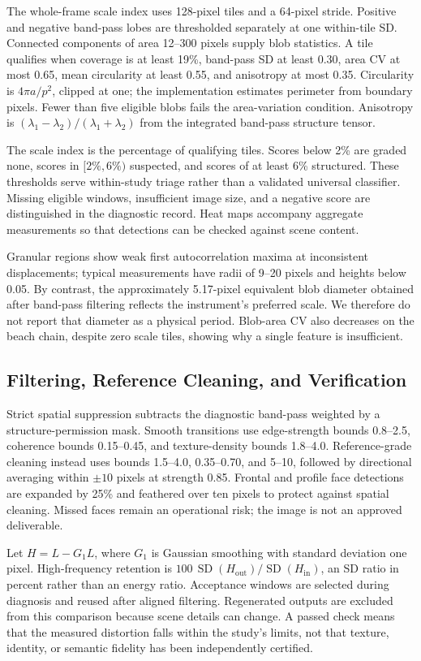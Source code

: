 \documentclass[sigplan,10pt,nonacm]{acmart}
\newcommand{\sd}{\operatorname{SD}}
\begin{document}
The whole-frame scale index uses 128-pixel tiles and a 64-pixel stride. Positive and negative band-pass lobes are thresholded separately at one within-tile SD. Connected components of area 12--300 pixels supply blob statistics. A tile qualifies when coverage is at least 19\%, band-pass SD at least 0.30, area CV at most 0.65, mean circularity at least 0.55, and anisotropy at most 0.35. Circularity is $4\pi a/p^2$, clipped at one; the implementation estimates perimeter from boundary pixels. Fewer than five eligible blobs fails the area-variation condition. Anisotropy is $(\lambda_1-\lambda_2)/(\lambda_1+\lambda_2)$ from the integrated band-pass structure tensor.

The scale index is the percentage of qualifying tiles. Scores below 2\% are graded none, scores in $[2\%,6\%)$ suspected, and scores of at least 6\% structured. These thresholds serve within-study triage rather than a validated universal classifier. Missing eligible windows, insufficient image size, and a negative score are distinguished in the diagnostic record. Heat maps accompany aggregate measurements so that detections can be checked against scene content.

Granular regions show weak first autocorrelation maxima at inconsistent displacements; typical measurements have radii of 9--20 pixels and heights below 0.05. By contrast, the approximately 5.17-pixel equivalent blob diameter obtained after band-pass filtering reflects the instrument's preferred scale. We therefore do not report that diameter as a physical period. Blob-area CV also decreases on the beach chain, despite zero scale tiles, showing why a single feature is insufficient.

\subsection{Filtering, Reference Cleaning, and Verification}
Strict spatial suppression subtracts the diagnostic band-pass weighted by a structure-permission mask. Smooth transitions use edge-strength bounds 0.8--2.5, coherence bounds 0.15--0.45, and texture-density bounds 1.8--4.0. Reference-grade cleaning instead uses bounds 1.5--4.0, 0.35--0.70, and 5--10, followed by directional averaging within $\pm10$ pixels at strength 0.85. Frontal and profile face detections are expanded by 25\% and feathered over ten pixels to protect against spatial cleaning. Missed faces remain an operational risk; the image is not an approved deliverable.

Let $H=L-G_1L$, where $G_1$ is Gaussian smoothing with standard deviation one pixel. High-frequency retention is $100\,\sd(H_{\mathrm{out}})/\sd(H_{\mathrm{in}})$, an SD ratio in percent rather than an energy ratio. Acceptance windows are selected during diagnosis and reused after aligned filtering. Regenerated outputs are excluded from this comparison because scene details can change. A passed check means that the measured distortion falls within the study's limits, not that texture, identity, or semantic fidelity has been independently certified.
\end{document}
